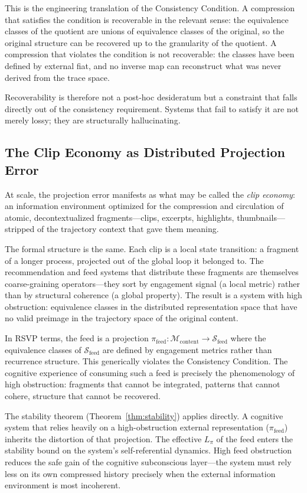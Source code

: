 \documentclass[12pt,a4paper]{article}
\begin{document}
This is the engineering translation of the Consistency Condition. A compression that satisfies the condition is recoverable in the relevant sense: the equivalence classes of the quotient are unions of equivalence classes of the original, so the original structure can be recovered up to the granularity of the quotient. A compression that violates the condition is not recoverable: the classes have been defined by external fiat, and no inverse map can reconstruct what was never derived from the trace space.

Recoverability is therefore not a post-hoc desideratum but a constraint that falls directly out of the consistency requirement. Systems that fail to satisfy it are not merely lossy; they are structurally hallucinating.

\subsection{The Clip Economy as Distributed Projection Error}

At scale, the projection error manifests as what may be called the \emph{clip economy}: an information environment optimized for the compression and circulation of atomic, decontextualized fragments---clips, excerpts, highlights, thumbnails---stripped of the trajectory context that gave them meaning.

The formal structure is the same. Each clip is a local state transition: a fragment of a longer process, projected out of the global loop it belonged to. The recommendation and feed systems that distribute these fragments are themselves coarse-graining operators---they sort by engagement signal (a local metric) rather than by structural coherence (a global property). The result is a system with high obstruction: equivalence classes in the distributed representation space that have no valid preimage in the trajectory space of the original content.

In RSVP terms, the feed is a projection $\pi_{\text{feed}} : \mathcal{M}_{\text{content}} \to \mathcal{S}_{\text{feed}}$ where the equivalence classes of $\mathcal{S}_{\text{feed}}$ are defined by engagement metrics rather than recurrence structure. This generically violates the Consistency Condition. The cognitive experience of consuming such a feed is precisely the phenomenology of high obstruction: fragments that cannot be integrated, patterns that cannot cohere, structure that cannot be recovered.

The stability theorem (Theorem~\ref{thm:stability}) applies directly. A cognitive system that relies heavily on a high-obstruction external representation ($\pi_{\text{feed}}$) inherits the distortion of that projection. The effective $L_\pi$ of the feed enters the stability bound on the system's self-referential dynamics. High feed obstruction reduces the safe gain of the cognitive subconscious layer---the system must rely less on its own compressed history precisely when the external information environment is most incoherent.
\end{document}
